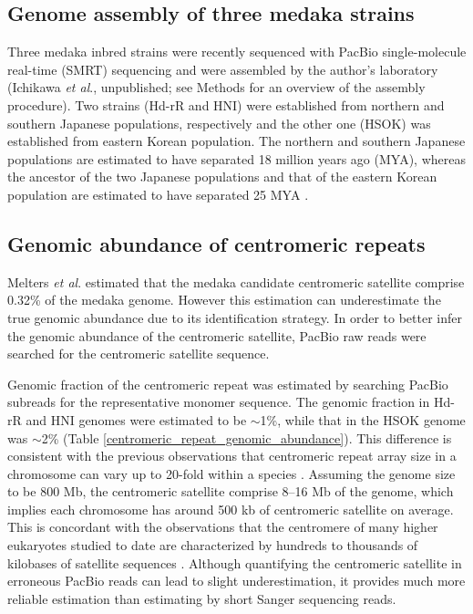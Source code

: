 \subsection*{Genome assembly of three medaka strains}
  Three medaka inbred strains were recently sequenced with PacBio single-molecule real-time (SMRT) sequencing and were assembled by the author's laboratory (Ichikawa \textit{et al}., unpublished; see Methods for an overview of the assembly procedure). Two strains (Hd-rR and HNI) were established from northern and southern Japanese populations, respectively and the other one (HSOK) was established from eastern Korean population. The northern and southern Japanese populations are estimated to have separated 18 million years ago (MYA), whereas the ancestor of the two Japanese populations and that of the eastern Korean population are estimated to have separated 25 MYA \cite{Setiamarga2009}.



\subsection*{Genomic abundance of centromeric repeats}
  Melters \textit{et al}. \cite{Melters2013} estimated that the medaka candidate centromeric satellite comprise 0.32\% of the medaka genome. However this estimation can underestimate the true genomic abundance due to its identification strategy. In order to better infer the genomic abundance of the centromeric satellite, PacBio raw reads were searched for the centromeric satellite sequence.

  Genomic fraction of the centromeric repeat was estimated by searching PacBio subreads for the representative monomer sequence. The genomic fraction in Hd-rR and HNI genomes were estimated to be $\sim$1\%, while that in the HSOK genome was $\sim$2\% (Table \ref{centromeric_repeat_genomic_abundance}). This difference is consistent with the previous observations that centromeric repeat array size in a chromosome can vary up to 20-fold within a species \cite{Miga2014}. Assuming the genome size to be 800 Mb, the centromeric satellite comprise 8--16 Mb of the genome, which implies each chromosome has around 500 kb of centromeric satellite on average. This is concordant with the observations that the centromere of many higher eukaryotes studied to date are characterized by hundreds to thousands of kilobases of satellite sequences \cite{Plohl2014}. Although quantifying the centromeric satellite in erroneous PacBio reads can lead to slight underestimation, it provides much more reliable estimation than estimating by short Sanger sequencing reads.

